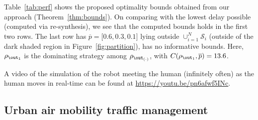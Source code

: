 Table~\ref{tab:perf} shows the proposed optimality bounds obtained from our approach (Theorem~\ref{thm:bounds}). On comparing with the lowest delay possible (computed via re-synthesis), we see that the computed bounds holds in the first two rows.   
The last row has $\overline{p} = \lbrack 0.6,0.3,0.1 \rbrack$ lying outside $\cup_{i=1}^N\mathcal{S}_i$ (outside of the dark shaded region in Figure~\ref{fig:partition}), has no informative bounds. Here, $\rho_{\out_1}$ is the dominating strategy among $\rho_{\out_{(\cdot)}}$, with $C(\rho_{\out_1},\overline{p})=13.6$.



A video of the simulation of the robot meeting the human (infinitely often) as the human moves in real-time can be found at \url{https://youtu.be/pn6afwf5INc}.

\subsection{Urban air mobility traffic management}

